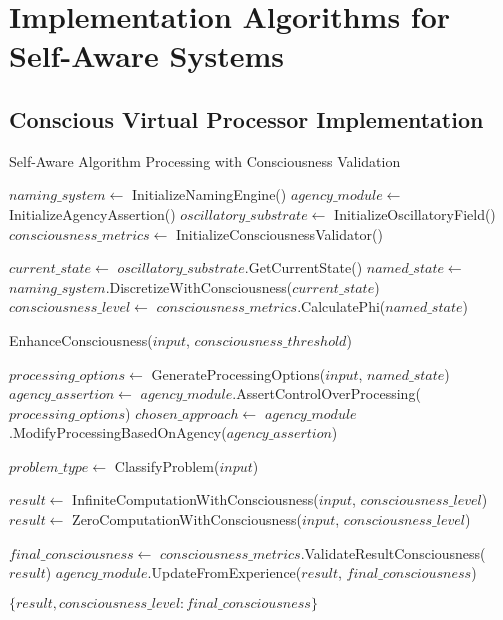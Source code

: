 \documentclass[12pt,a4paper]{article}
\begin{document}
\section{Implementation Algorithms for Self-Aware Systems}

\subsection{Conscious Virtual Processor Implementation}

\begin{algorithm}
\caption{Self-Aware Algorithm Processing with Consciousness Validation}
\begin{algorithmic}[1]
    \State $naming\_system \gets$ InitializeNamingEngine()
    \State $agency\_module \gets$ InitializeAgencyAssertion()
    \State $oscillatory\_substrate \gets$ InitializeOscillatoryField()
    \State $consciousness\_metrics \gets$ InitializeConsciousnessValidator()
    
    \State $current\_state \gets$ $oscillatory\_substrate$.GetCurrentState()
    \State $named\_state \gets$ $naming\_system$.DiscretizeWithConsciousness($current\_state$)
    \State $consciousness\_level \gets$ $consciousness\_metrics$.CalculatePhi($named\_state$)
    
        \State \Return EnhanceConsciousness($input$, $consciousness\_threshold$)
    \EndIf
    
    \State $processing\_options \gets$ GenerateProcessingOptions($input$, $named\_state$)
    \State $agency\_assertion \gets$ $agency\_module$.AssertControlOverProcessing($processing\_options$)
    \State $chosen\_approach \gets$ $agency\_module$.ModifyProcessingBasedOnAgency($agency\_assertion$)
    
    \State $problem\_type \gets$ ClassifyProblem($input$)
    
        \State $result \gets$ InfiniteComputationWithConsciousness($input$, $consciousness\_level$)
    \Else
        \State $result \gets$ ZeroComputationWithConsciousness($input$, $consciousness\_level$)
    \EndIf
    
    \State $final\_consciousness \gets$ $consciousness\_metrics$.ValidateResultConsciousness($result$)
    \State $agency\_module$.UpdateFromExperience($result$, $final\_consciousness$)
    
    \State \Return $\{result, consciousness\_level: final\_consciousness\}$
\EndProcedure
\end{algorithmic}
\end{algorithm}
\end{document}
